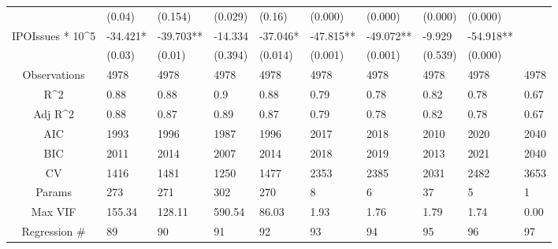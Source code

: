 \documentclass{article}
\begin{document}
\begin{table}[H]
\begin{tabular}{|clllllllll|}
   & (0.04) & (0.154) & (0.029) & (0.16) & (0.000) & (0.000) & (0.000) & (0.000) &  \\ 
  IPOIssues * 10^5 & -34.421* & -39.703** & -14.334 & -37.046* & -47.815** & -49.072** & -9.929 & -54.918** &  \\ 
   & (0.03) & (0.01) & (0.394) & (0.014) & (0.001) & (0.001) & (0.539) & (0.000) &  \\ 
  \hline 
 Observations & 4978 & 4978 & 4978 & 4978 & 4978 & 4978 & 4978 & 4978 & 4978 \\ 
  R^2 & 0.88 & 0.88 & 0.9 & 0.88 & 0.79 & 0.78 & 0.82 & 0.78 & 0.67 \\ 
  Adj R^2 & 0.88 & 0.87 & 0.89 & 0.87 & 0.79 & 0.78 & 0.82 & 0.78 & 0.67 \\ 
  AIC & 1993 & 1996 & 1987 & 1996 & 2017 & 2018 & 2010 & 2020 & 2040 \\ 
  BIC & 2011 & 2014 & 2007 & 2014 & 2018 & 2019 & 2013 & 2021 & 2040 \\ 
  CV & 1416 & 1481 & 1250 & 1477 & 2353 & 2385 & 2031 & 2482 & 3653 \\ 
  Params & 273 & 271 & 302 & 270 & 8 & 6 & 37 & 5 & 1 \\ 
  Max VIF & 155.34 & 128.11 & 590.54 & 86.03 & 1.93 & 1.76 & 1.79 & 1.74 & 0.00 \\ 
  Regression \# & 89 & 90 & 91 & 92 & 93 & 94 & 95 & 96 & 97 \\ 
   \hline
\end{tabular}
 
\end{table}
\end{document}
